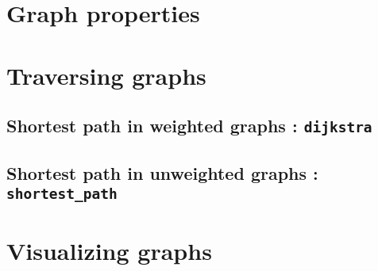 \documentclass[a4paper,11pt]{article}
\begin{document}
\section{Graph properties}

\section{Traversing graphs}

\subsection{Shortest path in weighted graphs : {\tt dijkstra}}

\subsection{Shortest path in unweighted graphs : {\tt shortest\_path}}

\section{Visualizing graphs}
\end{document}
